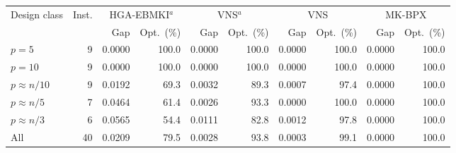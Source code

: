 \begin{tabular}{lrrrrrrrrr}
\toprule
Design class & Inst. & \multicolumn{2}{c}{HGA-EBMKI$^{a}$} & \multicolumn{2}{c}{VNS$^{a}$} & \multicolumn{2}{c}{VNS} & \multicolumn{2}{c}{MK-BPX} \\
 &  & Gap & Opt.\ (\%) & Gap & Opt.\ (\%) & Gap & Opt.\ (\%) & Gap & Opt.\ (\%) \\
\midrule
$p=5$ & 9 & 0.0000 & 100.0 & 0.0000 & 100.0 & 0.0000 & 100.0 & 0.0000 & 100.0 \\
$p=10$ & 9 & 0.0000 & 100.0 & 0.0000 & 100.0 & 0.0000 & 100.0 & 0.0000 & 100.0 \\
$p\approx n/10$ & 9 & 0.0192 & 69.3 & 0.0032 & 89.3 & 0.0007 & 97.4 & 0.0000 & 100.0 \\
$p\approx n/5$ & 7 & 0.0464 & 61.4 & 0.0026 & 93.3 & 0.0000 & 100.0 & 0.0000 & 100.0 \\
$p\approx n/3$ & 6 & 0.0565 & 54.4 & 0.0111 & 82.8 & 0.0012 & 97.8 & 0.0000 & 100.0 \\
\midrule
All & 40 & 0.0209 & 79.5 & 0.0028 & 93.8 & 0.0003 & 99.1 & 0.0000 & 100.0 \\
\bottomrule
\end{tabular}